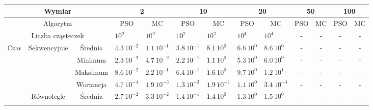 \documentclass[11pt, a4paper, oneside]{article}
\begin{document}
\renewcommand{\arraystretch}{2}
\begin{table}[H]
\scriptsize
\begin{adjustwidth}{-1.76cm}{}
\centering
\begin{tabular}{|c|c|c|l|l|l|l|l|l|c|c|c|c|}
\hline
\multicolumn{3}{|c|}{Wymiar}                                      & \multicolumn{2}{c|}{2}                             & \multicolumn{2}{c|}{10}                            & \multicolumn{2}{c|}{20}                            & \multicolumn{2}{c|}{50} & \multicolumn{2}{c|}{100} \\ \hline
\multicolumn{3}{|c|}{Algorytm}                                    & \multicolumn{1}{c|}{PSO} & \multicolumn{1}{c|}{MC} & \multicolumn{1}{c|}{PSO} & \multicolumn{1}{c|}{MC} & \multicolumn{1}{c|}{PSO} & \multicolumn{1}{c|}{MC} & PSO         & MC        & PSO         & MC         \\ \hline
\multicolumn{3}{|c|}{Liczba cząsteczek}                           & $10^{2}$                 & $10^{2}$                & $10^{2}$                 & $10^{2}$                & $10^{4}$                 & $10^{4}$                & -           & -         & -           & -          \\ \hline
\multirow{8}{*}{Czas} & \multirow{4}{*}{Sekwencyjnie} & Średnia   & $4.3 \ 10^{-2}$          & $1.1 \ 10^{-1}$         & $3.8 \ 10^{-1}$          & $8.1 \ 10^{0}$          & $6.6 \ 10^{0}$           & $8.6 \ 10^{0}$          & -           & -         & -           & -          \\ \cline{3-13} 
                      &                               & Minimum   & $2.3 \ 10^{-2}$          & $4.7 \ 10^{-2}$         & $2.2 \ 10^{-1}$          & $1.1 \ 10^{0}$          & $5.3 \ 10^{0}$           & $6.0 \ 10^{0}$          & -           & -         & -           & -          \\ \cline{3-13} 
                      &                               & Maksimum  & $8.6 \ 10^{-2}$          & $2.2 \ 10^{-1}$         & $6.4 \ 10^{-1}$          & $1.6 \ 10^{0}$          & $9.7 \ 10^{0}$           & $1.2 \ 10^{1}$          & -           & -         & -           & -          \\ \cline{3-13} 
                      &                               & Wariancja & $4.7 \ 10^{-4}$          & $1.9 \ 10^{-3}$         & $1.3 \ 10^{-3}$          & $1.9 \ 10^{-1}$         & $1.1 \ 10^{0}$           & $3.4 \ 10^{-1}$         & -           & -         & -           & -          \\ \cline{2-13} 
                      & \multirow{4}{*}{Równolegle}   & Średnia   & $2.7 \ 10^{-2}$          & $3.3 \ 10^{-2}$         & $1.4 \ 10^{-1}$          & $1.4 \ 10^{0}$          & $1.3 \ 10^{0}$           & $1.5 \ 10^{0}$          & -           & -         & -           & -          \\ \cline{3-13} 

\end{tabular}
\end{adjustwidth}
\end{table}
\end{document}
